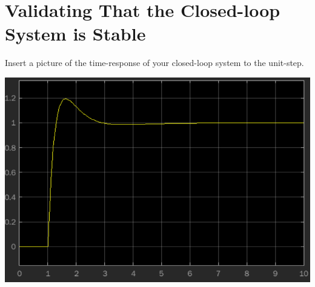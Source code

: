 \section{Validating That the Closed-loop System is Stable}

\begin{questions}
\setcounter{question}{\value{lastquestioncounter}}

\question[2M]
Insert a picture of the time-response of your closed-loop system to the unit-step.
\begin{solution}
   \begin{minipage}[htbp]{\linewidth}
      \centering
      \includegraphics[scale=0.67]{figures/closed_loop_time_response.png}
   \end{minipage}
\end{solution}

\setcounter{lastquestioncounter}{\value{question}}
\end{questions}
